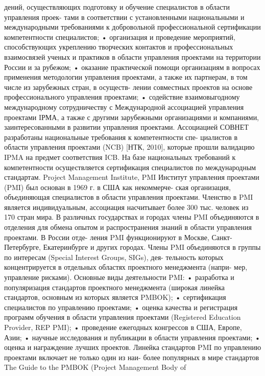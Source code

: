 дений, осуществляющих подготовку и обучение специалистов в области управления проек-
тами в соответствии с установленными национальными и международными требованиями
к добровольной профессиональной сертификации компетентности специалистов;
• организация и проведение мероприятий, способствующих укреплению творческих
контактов и профессиональных взаимосвязей ученых и практиков в области управления
проектами на территории России и за рубежом;
• оказание практической помощи организациям в вопросах применения методологии
управления проектами, а также их партнерам, в том числе из зарубежных стран, в осуществ-
лении совместных проектов на основе профессионального управления проектами;
• содействие взаимовыгодному международному сотрудничеству с Международной
ассоциацией управления проектами IРМА, а также с другими зарубежными организациями
и компаниями, заинтересованными в развитии управления проектами.
Ассоциацией СОВНЕТ разработаны национальные требования к компетентности спе-
циалистов в области управления проектами (NCB) [НТК, 2010], которые прошли валидацию
IPMA на предмет соответствия ICB. На базе национальных требований к компетентности
осуществляется сертификация специалистов по международным стандартам.
Project Management Institute, PMI
Институт управления проектами (PMI) был основан в 1969 г. в США как некоммерче-
ская организация, объединяющая специалистов в области управления проектами. Членство
в PMI является индивидуальным, ассоциация насчитывает более 300 тыс. человек из 170
стран мира. В различных государствах и городах члены PMI объединяются в отделения для
обмена опытом и распространения знаний в области управления проектами. В России отде-
ления PMI функционируют в Москве, Санкт-Петербурге, Екатеринбурге и других городах.
Члены PMI объединяются в группы по интересам (Special Interest Groups, SIGs), дея-
тельность которых концентрируется в отдельных областях проектного менеджмента (напри-
мер, управление рисками).
Основные виды деятельности PMI:
• разработка и популяризация стандартов проектного менеджмента (широкая линейка
стандартов, основным из которых является PMBOK);
• сертификация специалистов по управлению проектами;
• оценка качества и регистрация программ обучения в области управления проектами
(Registered Education Provider, REP PMI);
• проведение ежегодных конгрессов в США, Европе, Азии;
• научные исследования и публикации в области управления проектами;
• оценка и награждение лучших проектов.
Линейка стандартов PMI по управлению проектами включает не только один из наи-
более популярных в мире стандартов The Guide to the PMBOK (Project Management Body of
